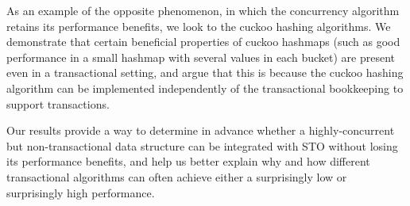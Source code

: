 As an example of the opposite phenomenon, in which the concurrency algorithm retains its performance benefits, we look to the cuckoo hashing algorithms. We demonstrate that certain beneficial properties of cuckoo hashmaps (such as good performance in a small hashmap with several values in each bucket) are present even in a transactional setting, and argue that this is because the cuckoo hashing algorithm can be implemented independently of the transactional bookkeeping to support transactions.

Our results provide a way to determine in advance whether a highly-concurrent but non-transactional data structure can be integrated with STO without losing its performance benefits, and help us better explain why and how different transactional algorithms can often achieve either a surprisingly low or surprisingly high performance.
